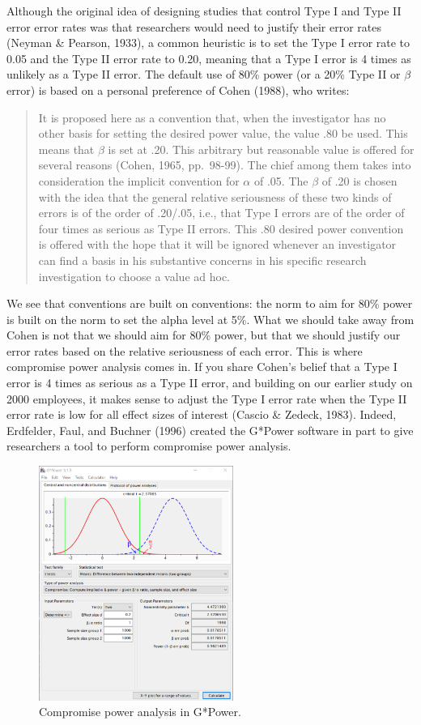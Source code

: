 \documentclass[
  english,
  ,jou, a4paper,floatsintext]{apa6}
\begin{document}
Although the original idea of designing studies that control Type I and Type II error error rates was that researchers would need to justify their error rates (Neyman \& Pearson, 1933), a common heuristic is to set the Type I error rate to 0.05 and the Type II error rate to 0.20, meaning that a Type I error is 4 times as unlikely as a Type II error. The default use of 80\% power (or a 20\% Type II or \(\beta\) error) is based on a personal preference of Cohen (1988), who writes:

\begin{quote}
It is proposed here as a convention that, when the investigator has no other basis for setting the desired power value, the value .80 be used. This means that \(\beta\) is set at .20. This arbitrary but reasonable value is offered for several reasons (Cohen, 1965, pp.~98-99). The chief among them takes into consideration the implicit convention for \(\alpha\) of .05. The \(\beta\) of .20 is chosen with the idea that the general relative seriousness of these two kinds of errors is of the order of .20/.05, i.e., that Type I errors are of the order of four times as serious as Type II errors. This .80 desired power convention is offered with the hope that it will be ignored whenever an investigator can find a basis in his substantive concerns in his specific research investigation to choose a value ad hoc.
\end{quote}

We see that conventions are built on conventions: the norm to aim for 80\% power is built on the norm to set the alpha level at 5\%. What we should take away from Cohen is not that we should aim for 80\% power, but that we should justify our error rates based on the relative seriousness of each error. This is where compromise power analysis comes in. If you share Cohen's belief that a Type I error is 4 times as serious as a Type II error, and building on our earlier study on 2000 employees, it makes sense to adjust the Type I error rate when the Type II error rate is low for all effect sizes of interest (Cascio \& Zedeck, 1983). Indeed, Erdfelder, Faul, and Buchner (1996) created the G*Power software in part to give researchers a tool to perform compromise power analysis.

\begin{figure}
\includegraphics[width=240px]{images/compromise1} \caption{Compromise power analysis in G*Power.}\label{fig:gpowcompromise}
\end{figure}
\end{document}
